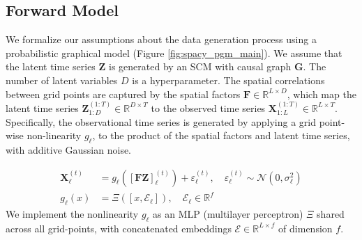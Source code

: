 
\subsection{Forward Model} \label{sec:forward_model} 
We formalize our assumptions about the data generation process using a probabilistic graphical model (Figure \ref{fig:spacy_pgm_main}). We assume that the latent time series $\mathbf{Z}$ is generated by an SCM with causal graph $\mathbf{G}$. The number of latent variables $D$ is a hyperparameter. The spatial correlations between grid points are captured by the spatial factors $\mathbf{F} \in \mathbb{R}^{L \times D}$, which map the latent time series $\mathbf{Z}^{(1:T)}_{1:D} \in \mathbb{R}^{D \times T}$ to the observed time series $\mathbf{X}^{(1:T)}_{1:L} \in \mathbb{R}^{L \times T}$. 
Specifically, the observational time series is generated by applying a grid point-wise non-linearity $g_\ell$, to the product of the spatial factors and latent time series, with additive Gaussian noise.  

\begin{align}
\mathbf{X}_\ell^{(t)} &= g_\ell \left( \left[ \mathbf{F}\mathbf{Z} \right]_\ell^{(t)} \right) + \varepsilon_\ell^{(t)}, \quad
\varepsilon_\ell^{(t)} \sim \mathcal{N}(0, \sigma^2_\ell) \nonumber \\
g_\ell(x) &= \Xi \left( \left[x, \mathscr{E}_\ell \right] \right), \quad \mathscr{E}_\ell \in \mathbb{R}^{f}   \label{eqn:decoder}
\end{align}
We implement the nonlinearity $g_\ell$ as an MLP (multilayer perceptron) $\Xi$ shared across all grid-points, with concatenated embeddings $\mathscr{E} \in \mathbb{R}^{L \times f}$ of dimension $f$.


% 

